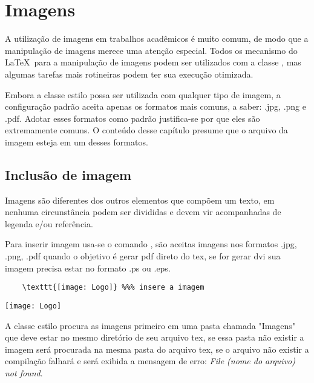 
\chapter{Imagens} \label{imagens}

A utilização de imagens em trabalhos acadêmicos é muito comum, de 
modo que a manipulação de imagens merece uma atenção especial. 
Todos os mecanismo do \LaTeX\ para a manipulação de imagens podem 
ser utilizados com a classe \estilo, mas algumas tarefas mais 
rotineiras podem ter sua execução otimizada.

Embora a classe estilo possa ser utilizada com qualquer tipo de 
imagem, a configuração padrão aceita apenas os formatos mais 
comuns, a saber: .jpg, .png e .pdf. Adotar esses formatos como 
padrão justifica-se por que eles são extremamente comuns. O 
conteúdo desse capítulo presume que o arquivo da imagem esteja em 
um desses formatos.


\section{Inclusão de imagem}


Imagens são diferentes dos outros elementos que compõem um texto, em
nenhuma circunstância podem ser divididas e devem vir acompanhadas 
de legenda e/ou referência.

Para inserir imagem usa-se o comando , 
são aceitas imagens nos formatos .jpg, .png, .pdf quando o objetivo 
é gerar pdf direto do tex, se for gerar dvi sua imagem precisa 
estar no formato .ps ou .eps.
\begin{tcolorbox}
\begin{lstlisting}
    \texttt{[image: Logo]} %%% insere a imagem
\end{lstlisting}
\end{tcolorbox}
\texttt{[image: Logo]}

A classe estilo procura as imagens primeiro em uma pasta 
chamada "\textsf{Imagens}"\, que deve estar no mesmo 
diretório de seu arquivo tex, se essa pasta não existir 
a imagem será procurada na mesma pasta do arquivo tex, 
se o arquivo não existir a compilação falhará e será 
exibida a mensagem de erro:
\textit{File (nome do arquivo) not found}.

